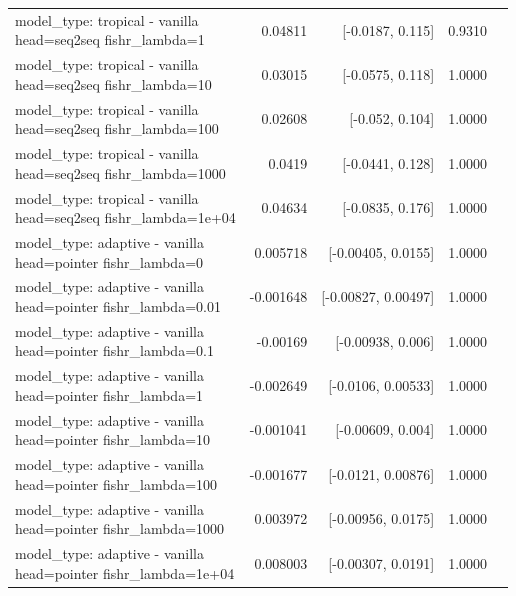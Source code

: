 \documentclass[10pt]{article}
\makeatletter
\newcommand{\stackcell}[1]{\begin{tabular}[t]{@{}l@{}}#1\end{tabular}}
\makeatother
\begin{document}
{\begin{longtable}{lrrrl}
\stackcell{model\_type: tropical - vanilla\\\footnotesize head=seq2seq fishr\_lambda=1 } & 0.04811 & [-0.0187, 0.115] & 0.9310 & \\
\stackcell{model\_type: tropical - vanilla\\\footnotesize head=seq2seq fishr\_lambda=10 } & 0.03015 & [-0.0575, 0.118] & 1.0000 & \\
\stackcell{model\_type: tropical - vanilla\\\footnotesize head=seq2seq fishr\_lambda=100 } & 0.02608 & [-0.052, 0.104] & 1.0000 & \\
\stackcell{model\_type: tropical - vanilla\\\footnotesize head=seq2seq fishr\_lambda=1000 } & 0.0419 & [-0.0441, 0.128] & 1.0000 & \\
\stackcell{model\_type: tropical - vanilla\\\footnotesize head=seq2seq fishr\_lambda=1e+04 } & 0.04634 & [-0.0835, 0.176] & 1.0000 & \\
\stackcell{model\_type: adaptive - vanilla\\\footnotesize head=pointer fishr\_lambda=0 } & 0.005718 & [-0.00405, 0.0155] & 1.0000 & \\
\stackcell{model\_type: adaptive - vanilla\\\footnotesize head=pointer fishr\_lambda=0.01 } & -0.001648 & [-0.00827, 0.00497] & 1.0000 & \\
\stackcell{model\_type: adaptive - vanilla\\\footnotesize head=pointer fishr\_lambda=0.1 } & -0.00169 & [-0.00938, 0.006] & 1.0000 & \\
\stackcell{model\_type: adaptive - vanilla\\\footnotesize head=pointer fishr\_lambda=1 } & -0.002649 & [-0.0106, 0.00533] & 1.0000 & \\
\stackcell{model\_type: adaptive - vanilla\\\footnotesize head=pointer fishr\_lambda=10 } & -0.001041 & [-0.00609, 0.004] & 1.0000 & \\
\stackcell{model\_type: adaptive - vanilla\\\footnotesize head=pointer fishr\_lambda=100 } & -0.001677 & [-0.0121, 0.00876] & 1.0000 & \\
\stackcell{model\_type: adaptive - vanilla\\\footnotesize head=pointer fishr\_lambda=1000 } & 0.003972 & [-0.00956, 0.0175] & 1.0000 & \\
\stackcell{model\_type: adaptive - vanilla\\\footnotesize head=pointer fishr\_lambda=1e+04 } & 0.008003 & [-0.00307, 0.0191] & 1.0000 & \\

\end{longtable}}
\end{document}
